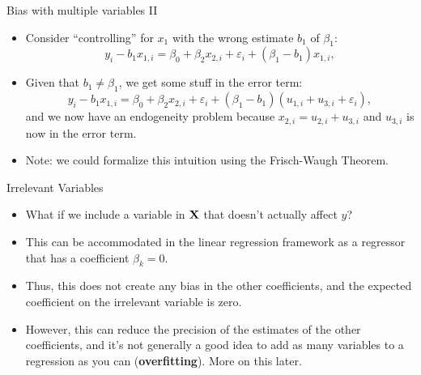 \documentclass[english,xcolor={dvipsnames},aspectratio=169]{beamer}
\begin{document}
\begin{frame}{Bias with multiple variables II}
\begin{itemize}
		\item Consider ``controlling'' for $x_1$ with the wrong estimate $b_1$ of $\beta_1$:\[
					y_i - b_1 x_{1,i} = \beta_0 + \beta_2 x_{2,i}  + \varepsilon_i + (\beta_1 - b_1) x_{1,i},
\]

\medskip
		\item Given that $b_1 \ne \beta_1$, we get some stuff in the error term:\[
					y_i - b_1 x_{1,i} = \beta_0 + \beta_2 x_{2,i}  + \varepsilon_i + (\beta_1 - b_1) (u_{1,i} + u_{3,i} + \varepsilon_i),
\]
and we now have an endogeneity problem because $x_{2,i} = u_{2,i} + u_{3,i}$ and $u_{3,i}$ is now in the error term.

\medskip
\item Note: we could formalize this intuition using the Frisch-Waugh Theorem. 
\end{itemize}
\end{frame}


\begin{frame}{Irrelevant Variables}
\begin{itemize}
	\item What if we include a variable in ${\bf X}$ that doesn't actually
	affect $y$?

	\smallskip
	\item This can be accommodated in the linear regression framework as
	a regressor that has a coefficient $\beta_{k}=0$.

	\smallskip
	\item Thus, this does not create any bias in the other coefficients, and the 
	expected coefficient on the irrelevant variable is zero.

	\smallskip
	\item However, this can reduce the precision of the estimates of the 
	other coefficients, and it's not generally a good idea to add as many variables
	to a regression as you can ({\bf overfitting}). More on this later. 

	
\end{itemize}
\end{frame}
\end{document}
